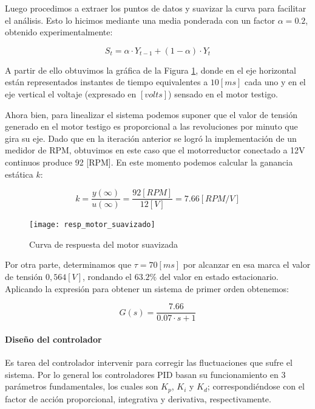 Luego procedimos a extraer los puntos de datos y suavizar la curva para facilitar el análisis. Esto lo hicimos mediante una media ponderada con un factor $\alpha = 0.2$, obtenido experimentalmente:

$$ S_{t} = \alpha \cdot Y_{t-1} + (1 - \alpha) \cdot Y_{t} $$

A partir de ello obtuvimos la gráfica de la Figura \ref{fig:curvarespmotorsuaviz}, donde en el eje horizontal están representados instantes de tiempo equivalentes a $10[ms]$ cada uno y en el eje vertical el voltaje (expresado en $[volts]$) sensado en el motor testigo.

Ahora bien, para linealizar el sistema podemos suponer que el valor de tensión generado en el motor testigo es proporcional a las revoluciones por minuto que gira su eje. Dado que en la iteración anterior se logró la implementación de un medidor de RPM, obtuvimos en este caso que el motorreductor conectado a 12V continuos produce 92 [RPM]. En este momento podemos calcular la ganancia estática $k$:

$$ k=\frac{y(\infty)}{u(\infty)}=\frac{92[RPM]}{12[V]}=7.66[RPM/V] $$

\begin{figure}[H]
    \centering
    \texttt{[image: resp\_motor\_suavizado]}
    \caption{Curva de respuesta del motor suavizada}
    \label{fig:curvarespmotorsuaviz}
\end{figure}

Por otra parte, determinamos que $\tau=70[ms]$ por alcanzar en esa marca el valor de tensión $0,564[V]$, rondando el $63.2\%$ del valor en estado estacionario. Aplicando la expresión para obtener un sistema de primer orden obtenemos:

$$ G(s) = \frac{7.66}{0.07 \cdot s + 1} $$


\paragraph{Diseño del controlador} \mbox{} \vspace{8pt}

Es tarea del controlador intervenir para corregir las fluctuaciones que sufre el sistema. Por lo general los controladores PID basan su funcionamiento en 3 parámetros fundamentales, los cuales son $K_p$, $K_i$ y $K_d$; correspondiéndose con el factor de acción proporcional, integrativa y derivativa, respectivamente.

